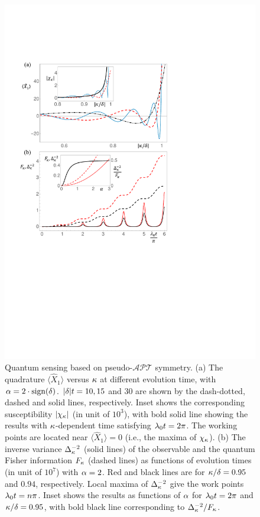 \documentclass[twocolumn,prl,floatfix,citeautoscript,nofootinbib,superscriptaddress]{revtex4}
\begin{document}
\begin{figure}[t]
\includegraphics[width=1.0\linewidth]{Fig2.pdf}
\caption{Quantum sensing based on pseudo-$\mathcal{APT}$ symmetry. (a) The
quadrature $\langle \hat{X}_{1}\rangle $ versus $\protect\kappa $ at
different evolution time, with $\protect\alpha =2\cdot \mathrm{sign}(\protect%
\delta )$. $|\protect\delta |t=10,15$ and $30$ are shown by the dash-dotted,
dashed and solid lines, respectively. Inset shows the corresponding
susceptibility $|\protect\chi _{\protect\kappa }|$ (in unit of $10^{3}$),
with bold solid line showing the results with $\protect\kappa $-dependent
time satisfying $\protect\lambda _{0}t=2\protect\pi $. The working points
are located near $\langle \hat{X}_{1}\rangle =0$ (i.e., the maxima of $%
\protect\chi _{\protect\kappa }$). (b) The inverse variance $\Delta _{%
\protect\kappa }^{-2}$ (solid lines) of the observable and the quantum
Fisher information $F_{\protect\kappa }$ (dashed lines) as functions of
evolution times (in unit of $10^{7}$) with $\protect\alpha =2$. Red and
black lines are for $\protect\kappa /\protect\delta =0.95$ and $0.94$,
respectively. Local maxima of $\Delta _{\protect\kappa }^{-2}$ give the work
points $\protect\lambda _{0}t=n\protect\pi $. Inset shows the results as
functions of $\protect\alpha $ for $\protect\lambda _{0}t=2\protect\pi $ and
$\protect\kappa /\protect\delta =0.95$, with bold black line corresponding
to $\Delta _{\protect\kappa }^{-2}/F_{\protect\kappa }$.}
\label{fig:2}
\end{figure}
\end{document}
